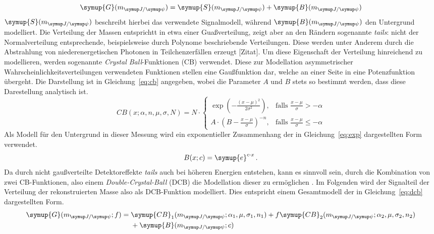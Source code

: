 %
\begin{equation}
  \symup{G}(m_{\jpsi})= \symup{S}(m_{\jpsi}) + \symup{B}(m_{\jpsi})
  \label{eq:massenfit}
\end{equation}
%
$\symup{S}(m_{\jpsi})$ beschreibt hierbei das verwendete Signalmodell, während $\symup{B}(m_{\jpsi})$ den Untergrund modelliert. Die Verteilung der Massen entsprichtt in etwa einer Guaßverteilung, zeigt aber an den Rändern sogenannte \textit{tails}: nicht der Normalverteilung entsprechende, beispielsweise durch Polynome beschriebende Verteilungen. Diese werden unter Anderem durch die Abstrahlung von niederenergetischen Photonen in Teilchenzerfällen erzeugt [Zitat]. Um diese Eigenschaft der Verteilung hinreichend zu modellieren, werden sogenannte \textit{Crystal Ball}-Funktionen (CB) verwendet. Diese zur Modellation asymmetrischer Wahrscheinlichkeitsverteilungen verwendeten Funktionen stellen eine Gaußfunktion dar, welche an einer Seite in eine Potenzfunktion übergeht. Die Darstellung ist in Gleichung~\ref{eq:cb} \cite{cb} angegeben, wobei die Parameter $A$ und $B$ stets so bestimmt werden, dass diese Darestellung analytisch ist.
%
\begin{equation}
  {\displaystyle CB(x;\alpha ,n,{\mu},\sigma,N)=N\cdot {\begin{cases}\exp \left(-{\frac {(x-{\mu})^{2}}{2\sigma ^{2}}}\right),&{\mbox{falls }}{\frac {x-{\mu}}{\sigma }}>-\alpha \\A\cdot \left(B-{\frac {x-{\mu}}{\sigma }}\right)^{-n},&{\mbox{falls }}{\frac {x-{\mu}}{\sigma }}\leqslant -\alpha \end{cases}}}
  \label{eq:cb}
\end{equation}
%
Als Modell für den Untergrund in dieser Messung wird ein exponentieller Zusammenhang der in Gleichung~\ref{eq:exp} dargestellten Form verwendet.
%
\begin{equation}
  B(x; c)= \symup{e}^{c\cdot x} \, .
  \label{eq:exp}
\end{equation}
%
Da durch nicht gaußverteilte Detektoreffekte \textit{tails} auch bei höheren Energien entstehen, kann es sinnvoll sein, durch die Kombination von zwei CB-Funktionen, also einem \textit{Double-Crystal-Ball} (DCB) die Modellation dieser zu ermöglichen \cite{ipatia}.
Im Folgenden wird der Signalteil der Verteilung der rekonstruierten Masse also als DCB-Funktion modelliert. Dies entspricht einem Gesamtmodell der in Gleichung~\ref{eq:dcb} dargestellten Form.
%
\begin{equation}
  \begin{split}
  \symup{G}(m_{\jpsi}; f)={}&\symup{CB}_1(m_{\jpsi};\alpha_1,\mu,\sigma_1,n_1) + f\symup{CB}_2(m_{\jpsi};\alpha_2,\mu,\sigma_2,n_2)\\ &+ \symup{B}(m_{\jpsi};c)
  \end{split}
  \label{eq:dcb}
\end{equation}

